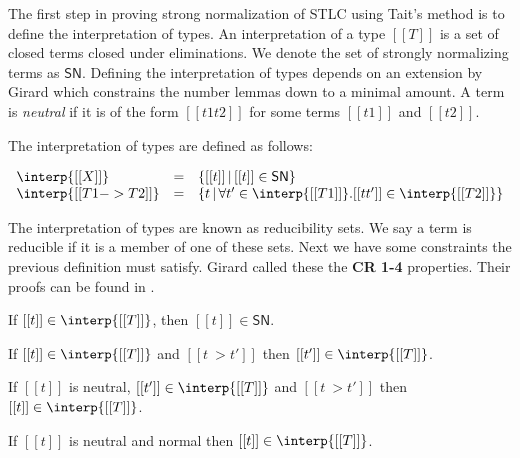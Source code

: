The first step in proving strong normalization of STLC using Tait's
method is to define the interpretation of types.  An interpretation of
a type $[[T]]$ is a set of closed terms closed under eliminations.  We
denote the set of strongly normalizing terms as $\mathsf{SN}$.
Defining the interpretation of types depends on an extension by Girard
which constrains the number lemmas down to a minimal amount.  A term
is \emph{neutral} if it is of the form $[[t1 t2]]$ for some terms
$[[t1]]$ and $[[t2]]$.  
\begin{definition}
  \label{def:stlc_interpretation_taits}
  The interpretation of types are defined as follows:
  \begin{center}
    \begin{math}
      \begin{array}{lll}
        \interp{[[X]]} & = & \{[[t]]\,|\, [[t]] \in \mathsf{SN} \}\\
        \interp{[[T1 -> T2]]} & = & \{ t\,|\,\forall t' \in \interp{[[T1]]}.
               [[t t']] \in \interp{[[T2]]} \}      
      \end{array}
    \end{math}
  \end{center}
\end{definition}
\noindent
The interpretation of types are known as reducibility sets.  We say a
term is reducible if it is a member of one of these sets.  Next we
have some constraints the previous definition must satisfy.  Girard
called these the \textbf{CR 1-4} properties.  Their proofs can be
found in \cite{Girard:1989}.
\begin{lemma}
  \label{lemma:stlc_sn_cr1}
  If $[[t]] \in \interp{[[T]]}$, then $[[t]] \in \mathsf{SN}$.
\end{lemma}

\begin{lemma}
  \label{lemma:stlc_sn_cr2}
  If $[[t]] \in \interp{[[T]]}$ and $[[t ~> t']]$ then $[[t']] \in \interp{[[T]]}$.
\end{lemma}

\begin{lemma}
  \label{lemma:stlc_sn_cr3}
  If $[[t]]$ is neutral, $[[t']] \in \interp{[[T]]}$ and $[[t ~> t']]$ then 
  $[[t]] \in \interp{[[T]]}$.
\end{lemma}

\begin{lemma}
  \label{lemma:stlc_sn_cr4}
  If $[[t]]$ is neutral and normal then $[[t]] \in \interp{[[T]]}$.
\end{lemma}

